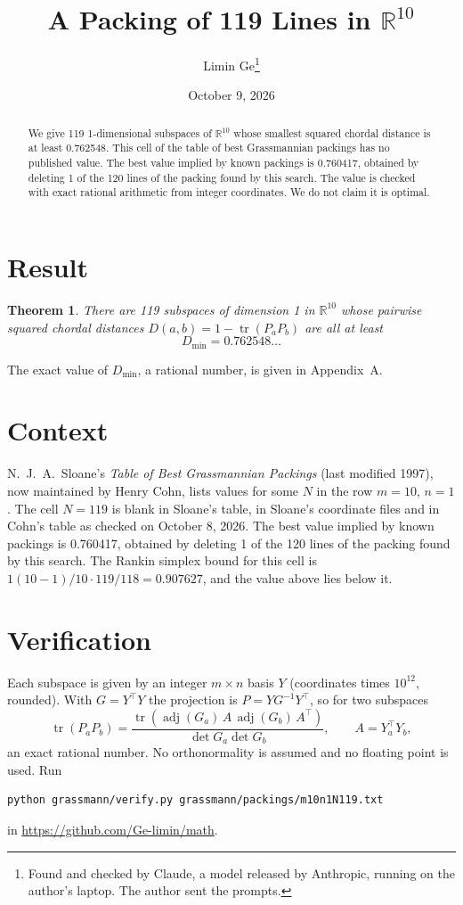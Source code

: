 \documentclass[11pt,a4paper]{article}
\title{A Packing of 119 Lines in $\mathbb{R}^{10}$}
\author{Limin Ge\thanks{Found and checked by Claude, a model released by Anthropic, running on the author's laptop. The author sent the prompts.}}
\date{October 9, 2026}
\newtheorem*{theorem}{Theorem}
\begin{document}
\maketitle
\begin{abstract}
We give 119 1-dimensional subspaces of $\mathbb{R}^{10}$ whose smallest squared chordal distance is at least 0.762548. This cell of the table of best Grassmannian packings has no published value. The best value implied by known packings is 0.760417, obtained by deleting 1 of the 120 lines of the packing found by this search. The value is checked with exact rational arithmetic from integer coordinates. We do not claim it is optimal.
\end{abstract}

\section{Result}
\begin{theorem}
There are 119 subspaces of dimension 1 in $\mathbb{R}^{10}$ whose pairwise squared chordal distances $D(a,b) = 1 - \operatorname{tr}(P_aP_b)$ are all at least
\[ D_{\min} = 0.762548\ldots \]
\end{theorem}
The exact value of $D_{\min}$, a rational number, is given in Appendix~A.


\section{Context}
N.~J.~A.~Sloane's \emph{Table of Best Grassmannian Packings} (last modified 1997), now maintained by Henry Cohn, lists values for some $N$ in the row $m=10$, $n=1$. The cell $N=119$ is blank in Sloane's table, in Sloane's coordinate files and in Cohn's table as checked on October 8, 2026. The best value implied by known packings is 0.760417, obtained by deleting 1 of the 120 lines of the packing found by this search. The Rankin simplex bound for this cell is $1(10-1)/10\cdot 119/118 = 0.907627$, and the value above lies below it.


\section{Verification}
Each subspace is given by an integer $m\times n$ basis $Y$ (coordinates times $10^{12}$, rounded). With $G=Y^\top Y$ the projection is $P=YG^{-1}Y^\top$, so for two subspaces
\[ \operatorname{tr}(P_aP_b)=\frac{\operatorname{tr}(\operatorname{adj}(G_a)\,A\,\operatorname{adj}(G_b)\,A^\top)}{\det G_a\det G_b},\qquad A=Y_a^\top Y_b, \]
an exact rational number. No orthonormality is assumed and no floating point is used. Run
\begin{verbatim}
python grassmann/verify.py grassmann/packings/m10n1N119.txt
\end{verbatim}
in \url{https://github.com/Ge-limin/math}.
\end{document}
